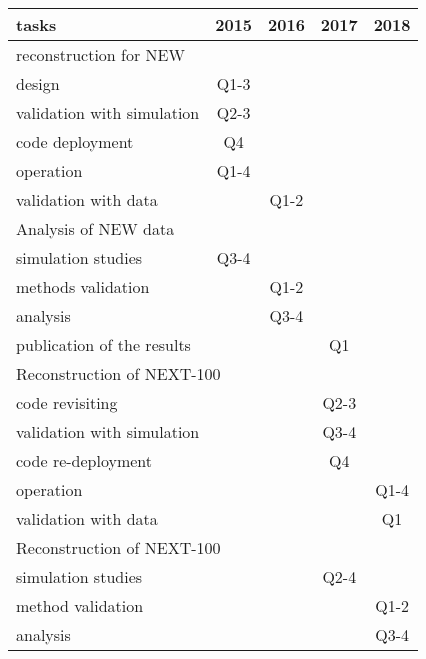 \begin{center}
\begin{tabular}{| l | c | c | c | c |}
\hline
tasks & 2015 & 2016 & 2017 & 2018 \\
\hline
\hline
\multicolumn{5}{|l|}{reconstruction for NEW}  \\
\hline
\hline
design & Q1-3 & & &  \\
validation with simulation & Q2-3 & & & \\
code deployment & Q4  & & & \\
operation  & Q1-4 & & & \\
validation with data & & Q1-2 & & \\
\hline
\hline
\multicolumn{5}{|l|}{Analysis of NEW data}  \\
\hline
\hline
simulation studies & Q3-4 & & & \\
methods validation & & Q1-2 &  & \\
analysis  & & Q3-4 &  & \\
publication of the results & & & Q1 & \\
\hline
\hline
\multicolumn{5}{|l|}{Reconstruction of NEXT-100}  \\
\hline
\hline
code revisiting &  &  &  Q2-3 & \\
validation with simulation & &  & Q3-4  & \\
code re-deployment  & &  & Q4   & \\
operation & & & & Q1-4 \\
validation with data & & & & Q1 \\
\hline
\hline
\multicolumn{5}{|l|}{Reconstruction of NEXT-100}  \\
\hline
\hline
simulation studies &  &  & Q2-4 & \\
method validation &  &  & & Q1-2\\
analysis & & & &  Q3-4\\
\hline
\end{tabular}
\label{tab:schedule_reco}
\end{center}

